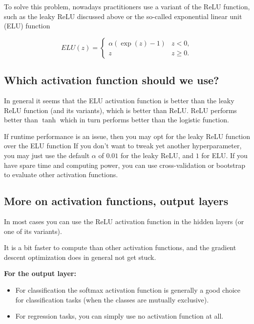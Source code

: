 \documentclass[%
oneside,                 %
final,                   %
10pt]{article}
\begin{document}
To solve this problem, nowadays practitioners use a  variant of the ReLU
function, such as the leaky ReLU discussed above or the so-called
exponential linear unit (ELU) function

\[
ELU(z) = \left\{\begin{array}{cc} \alpha\left( \exp{(z)}-1\right) & z < 0,\\  z & z \ge 0.\end{array}\right. 
\]

\subsection{Which activation function should we use?}

In general it seems that the ELU activation function is better than
the leaky ReLU function (and its variants), which is better than
ReLU. ReLU performs better than $\tanh$ which in turn performs better
than the logistic function. 

If runtime
performance is an issue, then you may opt for the  leaky ReLU function  over the 
ELU function If you don’t
want to tweak yet another hyperparameter, you may just use the default
$\alpha$ of $0.01$ for the leaky ReLU, and $1$ for ELU. If you have
spare time and computing power, you can use cross-validation or
bootstrap to evaluate other activation functions.

\subsection{More on activation functions, output layers}

In most cases you can use the ReLU activation function in the hidden layers (or one of its variants).

It is a bit faster to compute than other activation functions, and the gradient descent optimization does in general not get stuck.

\textbf{For the output layer:}

\begin{itemize}
\item For classification the softmax activation function is generally a good choice for classification tasks (when the classes are mutually exclusive).

\item For regression tasks, you can simply use no activation function at all.
\end{itemize}
\end{document}
